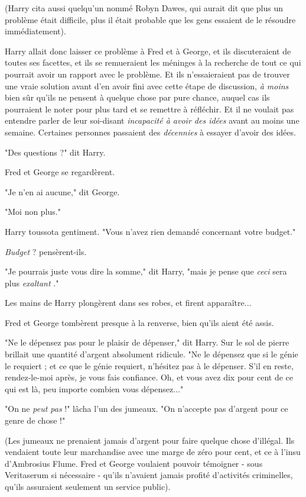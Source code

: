 (Harry cita aussi quelqu'un nommé Robyn Dawes, qui aurait dit que plus un problème était difficile, plus il était probable que les gens essaient de le résoudre immédiatement).

Harry allait donc laisser ce problème à Fred et à George, et ils discuteraient de toutes ses facettes, et ils se remueraient les méninges à la recherche de tout ce qui pourrait avoir un rapport avec le problème. Et ils n'essaieraient pas de trouver une vraie solution avant d'en avoir fini avec cette étape de discussion, \emph{à moins}  bien sûr qu'ils ne pensent à quelque chose par pure chance, auquel cas ils pourraient le noter pour plus tard et se remettre à réfléchir. Et il ne voulait pas entendre parler de leur soi-disant \emph{incapacité à avoir des idées}  avant au moins une semaine. Certaines personnes passaient des \emph{décennies} à essayer d'avoir des idées.

"Des questions ?" dit Harry.

Fred et George se regardèrent.

"Je n'en ai aucune," dit George.

"Moi non plus."

Harry toussota gentiment. "Vous n'avez rien demandé concernant votre budget."

\emph{Budget} ? pensèrent-ils.

"Je pourrais juste vous dire la somme," dit Harry, "mais je pense que \emph{ceci}  sera plus \emph{exaltant} ."

Les mains de Harry plongèrent dans ses robes, et firent apparaître...

Fred et George tombèrent presque à la renverse, bien qu'ils aient été assis.

"Ne le dépensez pas pour le plaisir de dépenser," dit Harry. Sur le sol de pierre brillait une quantité d'argent absolument ridicule. "Ne le dépensez que si le génie le requiert ; et ce que le génie requiert, n'hésitez pas à le dépenser. S'il en reste, rendez-le-moi après, je vous fais confiance. Oh, et vous avez dix pour cent de ce qui est là, peu importe combien vous dépensez..."

"On ne \emph{peut pas} !" lâcha l'un des jumeaux. "On n'accepte pas d'argent pour ce genre de chose !"

(Les jumeaux ne prenaient jamais d'argent pour faire quelque chose d'illégal. Ils vendaient toute leur marchandise avec une marge de zéro pour cent, et ce à l'insu d'Ambrosius Flume. Fred et George voulaient pouvoir témoigner - sous Veritaserum si nécessaire - qu'ils n'avaient jamais profité d'activités criminelles, qu'ils assuraient seulement un service public).

